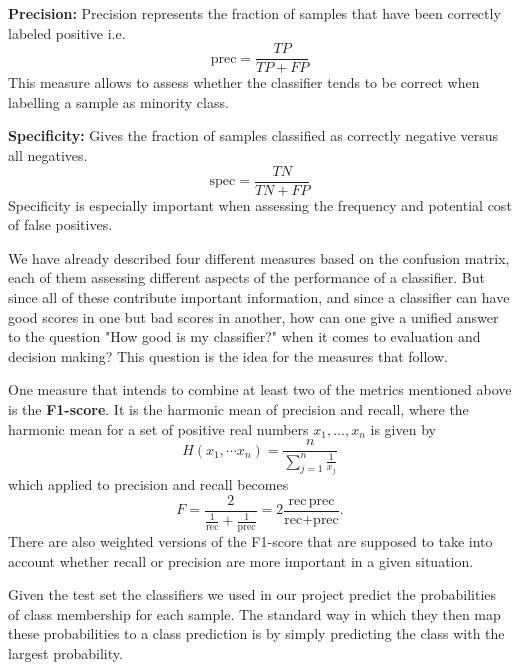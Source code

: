 \textbf{Precision:}
Precision represents the fraction of samples that have been correctly labeled positive i.e.
\[
	\text{prec} = \frac{TP}{TP + FP}
\]
This measure allows to assess whether the classifier tends to be correct when labelling a sample as minority class.

\textbf{Specificity:}
Gives the fraction of samples classified as correctly negative versus all negatives.
\[
	\text{spec} = \frac{TN}{TN + FP}
\]
Specificity is especially important when assessing the frequency and potential cost of false positives.

We have already described four different measures based on the confusion matrix, each of them assessing different aspects of the performance of a classifier.
But since all of these contribute important information, and since a classifier can have good scores in one but bad scores in another, 
how can one give a unified answer to the question "How good is my classifier?" when it comes to evaluation and decision making?
This question is the idea for the measures that follow.

One measure that intends to combine at least two of the metrics mentioned above is the \textbf{F1-score}.
It is the harmonic mean of precision and recall, where the harmonic mean for a set of positive real numbers $x_1, \dots, x_n$ is given by
\[
	H(x_1, \dotsm x_n) = \frac{n}{\sum_{j=1}^n \frac{1}{x_j}}
\]
which applied to precision and recall becomes
\[
	F = \frac{2}{ \frac{1}{\text{rec}} + \frac{1}{\text{prec}} } = 2 \frac{\text{rec} \, \text{prec}}{ \text{rec} + \text{prec} }.
\]
There are also weighted versions of the F1-score that are supposed to take into account whether recall or precision are more important in a given situation.

Given the test set the classifiers we used in our project predict the probabilities of class membership for each sample.
The standard way in which they then map these probabilities to a class prediction is by simply predicting the class with the largest probability.


